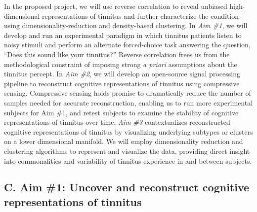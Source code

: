 \documentclass[11pt, notitlepage]{article} %
\begin{document}
In the proposed project, we will use reverse correlation to reveal unbiased high-dimensional
representations of tinnitus and further characterize the condition
using dimensionality-reduction and density-based clustering.
In \emph{Aim \#1}, we will develop and run an experimental paradigm
in which tinnitus patients listen to noisy stimuli and perform an alternate forced-choice task
answering the question, ``Does this sound like your tinnitus?''
Reverse correlation frees us from the methodological constraint of imposing strong \emph{a priori}
assumptions about the tinnitus percept.
In \emph{Aim \#2}, we will develop an open-source signal processing pipeline
to reconstruct cognitive representations of tinnitus using compressive sensing.
Compressive sensing holds promise to dramatically reduce the number of samples
needed for accurate reconstruction, enabling us to run more experimental subjects for Aim \#1,
and retest subjects to examine the stability of cognitive representations of tinnitus over time.
\emph{Aim \#3} contextualizes reconstructed cognitive representations of tinnitus
by visualizing underlying subtypes or clusters on a lower dimensional manifold.
We will employ dimensionality reduction and clustering algorithms to represent and visualize the data,
providing direct insight into commonalities and variability of tinnitus experience in and between subjects.


\subsection*{C. Aim \#1: Uncover and reconstruct cognitive representations of tinnitus}
\end{document}
